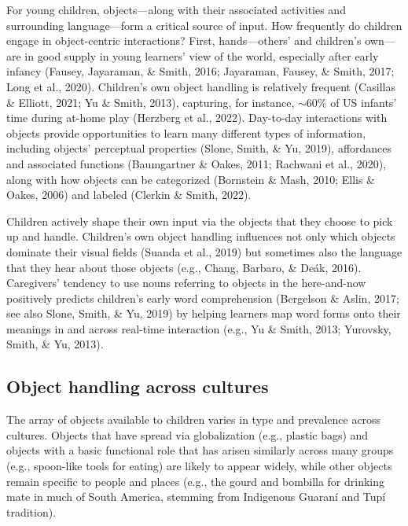 \documentclass[10pt, letterpaper]{article}
\begin{document}
For young children, objects---along with their associated activities and
surrounding language---form a critical source of input. How frequently
do children engage in object-centric interactions? First,
hands---others' and children's own---are in good supply in young
learners' view of the world, especially after early infancy (Fausey,
Jayaraman, \& Smith, 2016; Jayaraman, Fausey, \& Smith, 2017; Long et
al., 2020). Children's own object handling is relatively frequent
(Casillas \& Elliott, 2021; Yu \& Smith, 2013), capturing, for instance,
\({\sim}60\%\) of US infants' time during at-home play (Herzberg et al.,
2022). Day-to-day interactions with objects provide opportunities to
learn many different types of information, including objects' perceptual
properties (Slone, Smith, \& Yu, 2019), affordances and associated
functions (Baumgartner \& Oakes, 2011; Rachwani et al., 2020), along
with how objects can be categorized (Bornstein \& Mash, 2010; Ellis \&
Oakes, 2006) and labeled (Clerkin \& Smith, 2022).

Children actively shape their own input via the objects that they choose
to pick up and handle. Children's own object handling influences not
only which objects dominate their visual fields (Suanda et al., 2019)
but sometimes also the language that they hear about those objects
(e.g., Chang, Barbaro, \& Deák, 2016). Caregivers' tendency to use nouns
referring to objects in the here-and-now positively predicts children's
early word comprehension (Bergelson \& Aslin, 2017; see also Slone,
Smith, \& Yu, 2019) by helping learners map word forms onto their
meanings in and across real-time interaction (e.g., Yu \& Smith, 2013;
Yurovsky, Smith, \& Yu, 2013).

\hypertarget{object-handling-across-cultures}{%
\subsection{Object handling across
cultures}\label{object-handling-across-cultures}}

The array of objects available to children varies in type and prevalence
across cultures. Objects that have spread via globalization (e.g.,
plastic bags) and objects with a basic functional role that has arisen
similarly across many groups (e.g., spoon-like tools for eating) are
likely to appear widely, while other objects remain specific to people
and places (e.g., the gourd and bombilla for drinking mate in much of
South America, stemming from Indigenous Guaraní and Tupí tradition).
\end{document}

